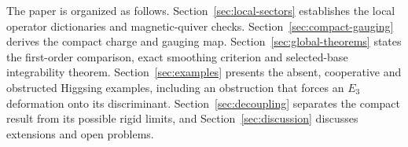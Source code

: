 The paper is organized as follows. Section~\ref{sec:local-sectors} establishes
the local operator dictionaries and magnetic-quiver checks.
Section~\ref{sec:compact-gauging} derives the compact charge and gauging map.
Section~\ref{sec:global-theorems} states the first-order comparison, exact
smoothing criterion and selected-base integrability theorem.
Section~\ref{sec:examples} presents the absent, cooperative and obstructed
Higgsing examples, including an obstruction that forces an $E_3$ deformation
onto its discriminant. Section~\ref{sec:decoupling}
separates the compact result from its possible rigid limits, and
Section~\ref{sec:discussion} discusses extensions and open problems.
